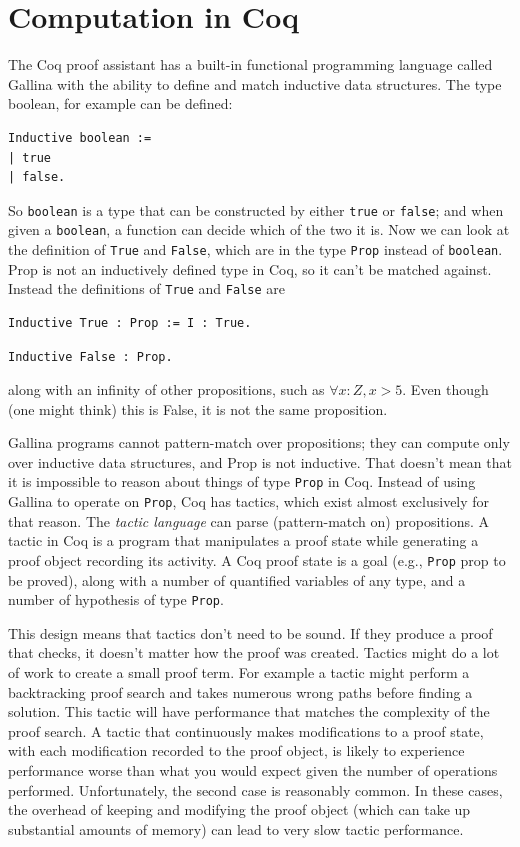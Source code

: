 \documentclass{puthesis}
\begin{document}
\chapter{Computation in Coq}
\label{ch:computation}
The Coq proof assistant has a built-in functional programming language
called Gallina with the ability to define and match inductive
data structures. The type boolean, for example can be defined:

\begin{lstlisting}
Inductive boolean :=
| true
| false.
\end{lstlisting}

So \lstinline|boolean| is a type that can be constructed by either
\lstinline|true| or \lstinline|false|; and when given a
\lstinline|boolean|, a function can decide which of the two it is. Now
we can look at the definition of \lstinline|True| and
\lstinline|False|, which are in the type
\lstinline|Prop| instead of \lstinline|boolean|. Prop is not an
inductively defined type in Coq, so it can't be matched
against. Instead the definitions of \lstinline|True| and \lstinline|False|
are

\begin{lstlisting}
Inductive True : Prop := I : True.
\end{lstlisting}
\begin{lstlisting}
Inductive False : Prop.
\end{lstlisting}

\noindent along with an infinity of other propositions, such as
$\forall x:Z, x>5$.  Even though (one might think) this is False, it is not
the same proposition.

\noindent 
Gallina programs cannot pattern-match over propositions; they can
compute only over inductive data structures, and Prop is not
inductive. That doesn't mean that it is impossible to reason about
things of type \lstinline|Prop| in Coq. Instead of using Gallina to
operate on \lstinline|Prop|, Coq has tactics, which exist almost
exclusively for that reason. The \emph{tactic language} can parse
(pattern-match on) propositions. A tactic in Coq is a program that
manipulates a proof state while generating a proof object recording
its activity. A Coq proof state is a goal (e.g., \lstinline|Prop| prop
to be proved), along with a number of quantified variables of any
type, and a number of hypothesis of type \lstinline|Prop|. 

This design means that tactics don't need to be sound. If they produce
a proof that checks, it doesn't matter how the proof was
created. Tactics might do a lot of work to create a small proof
term. For example a tactic might perform a backtracking proof search
and takes numerous wrong paths before finding a solution. This tactic
will have performance that matches the complexity of the proof
search. A tactic that continuously makes modifications to a proof
state, with each modification recorded to the proof object, is likely
to experience performance worse than what you would expect given the
number of operations performed. Unfortunately, the second case is
reasonably common. In these cases, the overhead of keeping and
modifying the proof object (which can take up substantial amounts of
memory) can lead to very slow tactic performance.
\end{document}
